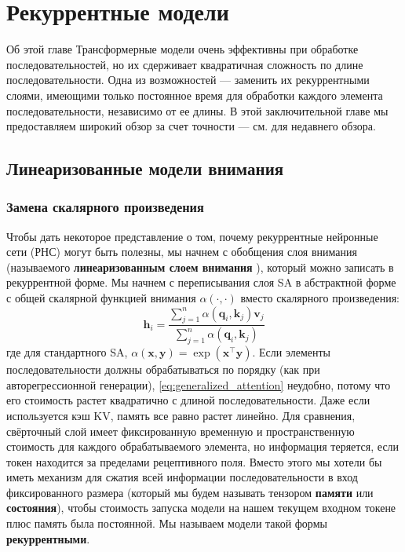 \chapter{Рекуррентные модели}
\label{chap:rnns}

\begin{supportbox}{Об этой главе}
Трансформерные модели очень эффективны при обработке последовательностей, но их сдерживает квадратичная сложность по длине последовательности. Одна из возможностей — заменить их рекуррентными слоями, имеющими только постоянное время для обработки каждого элемента последовательности, независимо от ее длины. В этой заключительной главе мы предоставляем широкий обзор за счет точности — см. \cite{tiezzi2024state} для недавнего обзора.
\end{supportbox}

\section{Линеаризованные модели внимания}
\subsection{Замена скалярного произведения}
\label{sec:linearized_transformer_model}

Чтобы дать некоторое представление о том, почему рекуррентные нейронные сети (РНС) могут быть полезны, мы начнем с обобщения слоя внимания (называемого \textbf{линеаризованным слоем внимания} \cite{katharopoulos2020transformers}), который можно записать в рекуррентной форме. Мы начнем с переписывания слоя SA в абстрактной форме с общей скалярной функцией внимания $\alpha(\cdot, \cdot)$ вместо скалярного произведения:
%
\begin{equation}
\mathbf{h}_i=\frac{\sum_{j=1}^n\alpha\left(\mathbf{q}_i, \mathbf{k}_j\right)\mathbf{v}_j}{\sum_{j=1}^n \alpha\left(\mathbf{q}_i, \mathbf{k}_j\right)}
\label{eq:generalized_attention}
\end{equation}
%
где для стандартного SA, $\alpha(\mathbf{x}, \mathbf{y})=\exp(\mathbf{x}^\top\mathbf{y})$. Если элементы последовательности должны обрабатываться по порядку (как при авторегрессионной генерации), \eqref{eq:generalized_attention} неудобно, потому что его стоимость растет квадратично с длиной последовательности. Даже если используется кэш KV, память все равно растет линейно. Для сравнения, свёрточный слой имеет фиксированную временную и пространственную стоимость для каждого обрабатываемого элемента, но информация теряется, если токен находится за пределами рецептивного поля. Вместо этого мы хотели бы иметь механизм для сжатия всей информации последовательности в вход фиксированного размера (который мы будем называть тензором \textbf{памяти} или \textbf{состояния}), чтобы стоимость запуска модели на нашем текущем входном токене плюс память была постоянной. Мы называем модели такой формы \textbf{рекуррентными}.

